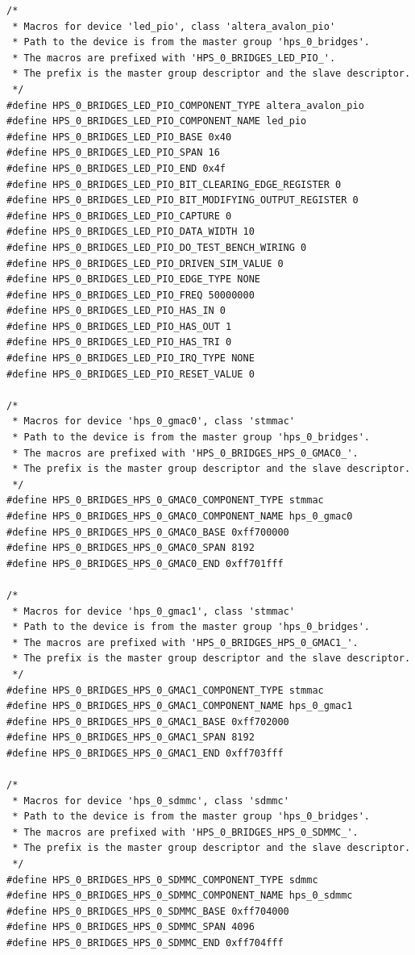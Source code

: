 \documentclass[conference]{IEEEtran}
\begin{document}
\begin{lstlisting}
/*
 * Macros for device 'led_pio', class 'altera_avalon_pio'
 * Path to the device is from the master group 'hps_0_bridges'.
 * The macros are prefixed with 'HPS_0_BRIDGES_LED_PIO_'.
 * The prefix is the master group descriptor and the slave descriptor.
 */
#define HPS_0_BRIDGES_LED_PIO_COMPONENT_TYPE altera_avalon_pio
#define HPS_0_BRIDGES_LED_PIO_COMPONENT_NAME led_pio
#define HPS_0_BRIDGES_LED_PIO_BASE 0x40
#define HPS_0_BRIDGES_LED_PIO_SPAN 16
#define HPS_0_BRIDGES_LED_PIO_END 0x4f
#define HPS_0_BRIDGES_LED_PIO_BIT_CLEARING_EDGE_REGISTER 0
#define HPS_0_BRIDGES_LED_PIO_BIT_MODIFYING_OUTPUT_REGISTER 0
#define HPS_0_BRIDGES_LED_PIO_CAPTURE 0
#define HPS_0_BRIDGES_LED_PIO_DATA_WIDTH 10
#define HPS_0_BRIDGES_LED_PIO_DO_TEST_BENCH_WIRING 0
#define HPS_0_BRIDGES_LED_PIO_DRIVEN_SIM_VALUE 0
#define HPS_0_BRIDGES_LED_PIO_EDGE_TYPE NONE
#define HPS_0_BRIDGES_LED_PIO_FREQ 50000000
#define HPS_0_BRIDGES_LED_PIO_HAS_IN 0
#define HPS_0_BRIDGES_LED_PIO_HAS_OUT 1
#define HPS_0_BRIDGES_LED_PIO_HAS_TRI 0
#define HPS_0_BRIDGES_LED_PIO_IRQ_TYPE NONE
#define HPS_0_BRIDGES_LED_PIO_RESET_VALUE 0

/*
 * Macros for device 'hps_0_gmac0', class 'stmmac'
 * Path to the device is from the master group 'hps_0_bridges'.
 * The macros are prefixed with 'HPS_0_BRIDGES_HPS_0_GMAC0_'.
 * The prefix is the master group descriptor and the slave descriptor.
 */
#define HPS_0_BRIDGES_HPS_0_GMAC0_COMPONENT_TYPE stmmac
#define HPS_0_BRIDGES_HPS_0_GMAC0_COMPONENT_NAME hps_0_gmac0
#define HPS_0_BRIDGES_HPS_0_GMAC0_BASE 0xff700000
#define HPS_0_BRIDGES_HPS_0_GMAC0_SPAN 8192
#define HPS_0_BRIDGES_HPS_0_GMAC0_END 0xff701fff

/*
 * Macros for device 'hps_0_gmac1', class 'stmmac'
 * Path to the device is from the master group 'hps_0_bridges'.
 * The macros are prefixed with 'HPS_0_BRIDGES_HPS_0_GMAC1_'.
 * The prefix is the master group descriptor and the slave descriptor.
 */
#define HPS_0_BRIDGES_HPS_0_GMAC1_COMPONENT_TYPE stmmac
#define HPS_0_BRIDGES_HPS_0_GMAC1_COMPONENT_NAME hps_0_gmac1
#define HPS_0_BRIDGES_HPS_0_GMAC1_BASE 0xff702000
#define HPS_0_BRIDGES_HPS_0_GMAC1_SPAN 8192
#define HPS_0_BRIDGES_HPS_0_GMAC1_END 0xff703fff

/*
 * Macros for device 'hps_0_sdmmc', class 'sdmmc'
 * Path to the device is from the master group 'hps_0_bridges'.
 * The macros are prefixed with 'HPS_0_BRIDGES_HPS_0_SDMMC_'.
 * The prefix is the master group descriptor and the slave descriptor.
 */
#define HPS_0_BRIDGES_HPS_0_SDMMC_COMPONENT_TYPE sdmmc
#define HPS_0_BRIDGES_HPS_0_SDMMC_COMPONENT_NAME hps_0_sdmmc
#define HPS_0_BRIDGES_HPS_0_SDMMC_BASE 0xff704000
#define HPS_0_BRIDGES_HPS_0_SDMMC_SPAN 4096
#define HPS_0_BRIDGES_HPS_0_SDMMC_END 0xff704fff


\end{lstlisting}
\end{document}
